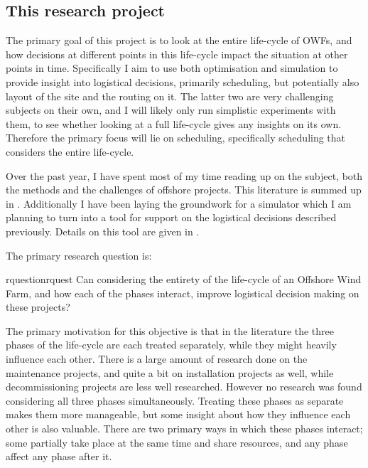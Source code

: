 \documentclass[a4paper,12pt]{article}
\begin{document}
\subsection{This research project} \label{ss:objs}
The primary goal of this project is to look at the entire life-cycle of OWFs, and how decisions at different points in this life-cycle impact the situation at other points in time. Specifically I aim to use both optimisation and simulation to provide insight into logistical decisions, primarily scheduling, but potentially also layout of the site and the routing on it. The latter two are very challenging subjects on their own, and I will likely only run simplistic experiments with them, to see whether looking at a full life-cycle gives any insights on its own. Therefore the primary focus will lie on scheduling, specifically scheduling that considers the entire life-cycle. 

Over the past year, I have spent most of my time reading up on the subject, both the methods and the challenges of offshore projects. This literature is summed up in . Additionally I have been laying the groundwork for a simulator which I am planning to turn into a tool for support on the logistical decisions described previously. Details on this tool are given in .

\bigskip

The primary research question is:

\begin{restatable}{rquestion}{rquest}
Can considering the entirety of the life-cycle of an Offshore Wind Farm, and how each of the phases interact, improve logistical decision making on these projects?
\label{rquest}
\end{restatable}

The primary motivation for this objective is that in the literature the three phases of the life-cycle are each treated separately, while they might heavily influence each other. There is a large amount of research done on the maintenance projects, and quite a bit on installation projects as well, while decommissioning projects are less well researched. However no research was found considering all three phases simultaneously. Treating these phases as separate makes them more manageable, but some insight about how they influence each other is also valuable. There are two primary ways in which these phases interact; some partially take place at the same time and share resources, and any phase affect any phase after it. 
\end{document}
